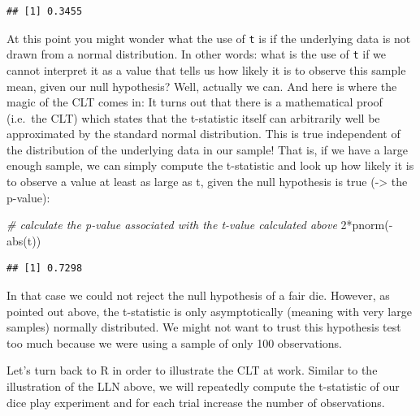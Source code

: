 \documentclass[
  12pt,
]{style/krantz}
\newenvironment{Shaded}{\begin{snugshade}}{\end{snugshade}}
\newcommand{\CommentTok}[1]{\textcolor[rgb]{0.56,0.35,0.01}{\textit{#1}}}
\newcommand{\DecValTok}[1]{\textcolor[rgb]{0.00,0.00,0.81}{#1}}
\newcommand{\FunctionTok}[1]{\textcolor[rgb]{0.00,0.00,0.00}{#1}}
\newcommand{\NormalTok}[1]{#1}
\newcommand{\SpecialCharTok}[1]{\textcolor[rgb]{0.00,0.00,0.00}{#1}}
\begin{document}
\begin{verbatim}
## [1] 0.3455
\end{verbatim}

At this point you might wonder what the use of \texttt{t} is if the underlying data is not drawn from a normal distribution. In other words: what is the use of \texttt{t} if we cannot interpret it as a value that tells us how likely it is to observe this sample mean, given our null hypothesis? Well, actually we can. And here is where the magic of the CLT comes in: It turns out that there is a mathematical proof (i.e.~the CLT) which states that the t-statistic itself can arbitrarily well be approximated by the standard normal distribution. This is true independent of the distribution of the underlying data in our sample! That is, if we have a large enough sample, we can simply compute the t-statistic and look up how likely it is to observe a value at least as large as t, given the null hypothesis is true (-\textgreater{} the p-value):

\begin{Shaded}
\begin{Highlighting}[]
\CommentTok{\# calculate the p{-}value associated with the t{-}value calculated above}
\DecValTok{2}\SpecialCharTok{*}\FunctionTok{pnorm}\NormalTok{(}\SpecialCharTok{{-}}\FunctionTok{abs}\NormalTok{(t))}
\end{Highlighting}
\end{Shaded}

\begin{verbatim}
## [1] 0.7298
\end{verbatim}

In that case we could not reject the null hypothesis of a fair die. However, as pointed out above, the t-statistic is only asymptotically (meaning with very large samples) normally distributed. We might not want to trust this hypothesis test too much because we were using a sample of only 100 observations.

Let's turn back to R in order to illustrate the CLT at work. Similar to the illustration of the LLN above, we will repeatedly compute the t-statistic of our dice play experiment and for each trial increase the number of observations.
\end{document}
